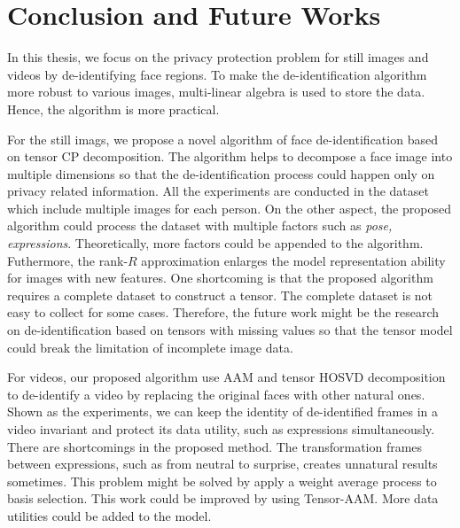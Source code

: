 \iffalse

\fi

\chapter{Conclusion and Future Works}
\label{chap:conclusions}

In this thesis, we focus on the privacy protection problem for still images and videos
by de-identifying face regions. To make the de-identification algorithm more robust to
various images, multi-linear algebra is used to store the data. Hence, the algorithm
is more practical. 

For the still imags, we propose a novel algorithm of face de-identification based on 
tensor CP decomposition. The algorithm helps to decompose a face image into multiple 
dimensions so that the de-identification process could happen only on privacy 
related information. All the experiments are conducted in the dataset which 
include multiple images for each person. On the other aspect, the proposed algorithm 
could process the dataset with multiple factors such as {\it pose, expressions}. 
Theoretically, more factors could be appended to the algorithm. Futhermore, the rank-$R$
approximation enlarges the model representation ability for images with new features.
One shortcoming is that the proposed algorithm requires a complete dataset to construct
a tensor. The complete dataset is not easy to collect for some cases. Therefore, the future 
work might be the research on de-identification based on tensors with missing values 
so that the tensor model could break the limitation of incomplete image data. 

For videos, our proposed algorithm use AAM and tensor HOSVD decomposition to de-identify 
a video by replacing the original faces with other natural ones. Shown as the experiments, 
we can keep the identity of de-identified frames in a video invariant and protect its data 
utility, such as expressions simultaneously. There are shortcomings in the proposed method. 
The transformation frames between expressions, such as from neutral to surprise, creates 
unnatural results sometimes. This problem might be solved by apply a weight average process 
to basis selection. This work could be improved by using Tensor-AAM. More data utilities 
could be added to the model.